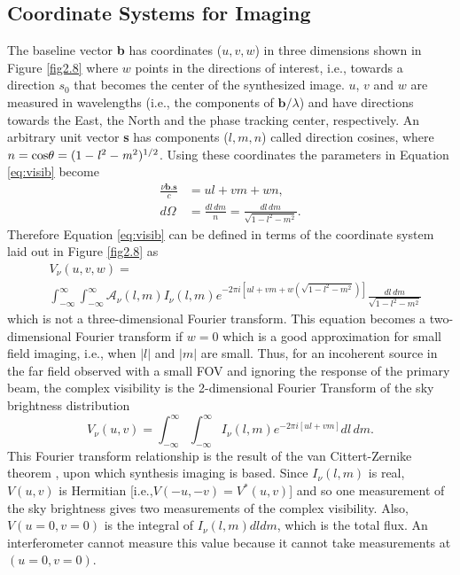 \subsection{Coordinate Systems for Imaging}\label{subsec:7}
The baseline vector \textbf{b} has coordinates ($u,v,w$) in three dimensions shown in Figure \ref{fig2.8} where $w$ points in the directions of interest, i.e., towards a direction \textbf{$s_{0}$} that becomes the center of the synthesized image. $u$, $v$ and $w$ are measured in wavelengths (i.e., the components of $\textbf{b}/\lambda$) and have directions towards the East, the North and the phase tracking center, respectively. An arbitrary unit vector \textbf{s} has components ($l,m,n$) called direction cosines, where $n=\rm{cos}\theta=(1-\mathit{l}^2-\mathit{m}^2)^{1/2}$. Using these coordinates the parameters in Equation \ref{eq:visib} become
\begin{equation}
\begin{split}
\frac{\nu \textbf{b}.\textbf{s}}{c}&=ul+vm+wn, \\
d\Omega &= \frac{dl\,dm}{n}=\frac{dl\,dm}{\sqrt{1-l^2-m^2}}.
\end{split}
\end{equation}
Therefore Equation \ref{eq:visib} can be defined in terms of the coordinate system laid out in Figure \ref{fig2.8} as
\begin{equation}\label{eq:3-d_vis}
\begin{split}
&V_{\nu}(u,v,w)=\\
&\int ^{\infty}_{-\infty}\int ^{\infty}_{-\infty} \mathcal{A}_{\nu}(l,m)I_{\nu}(l,m)\mathit{e}^{-2\pi \mathit{i}[ul+vm+w(\sqrt{1-l^2-m^2})] }\frac{dl\,dm}{\sqrt{1-l^2-m^2}}
\end{split}
\end{equation}
which is not a three-dimensional Fourier transform. This equation becomes a two-dimensional Fourier transform if $w=0$ which is a good approximation for small field imaging, i.e., when $|l|$ and $|m|$ are small. Thus, for an incoherent source in the far field observed with a small FOV and ignoring the response of the primary beam, the complex visibility  is the 2-dimensional Fourier Transform of the sky brightness distribution
\begin{equation}\label{eq:2-d_vis}
V_{\nu}(u,v)=\int ^{\infty}_{-\infty}\int ^{\infty}_{-\infty} I_{\nu}(l,m)\mathit{e}^{-2\pi \mathit{i}[ul+vm]}dl\,dm.
\end{equation}
This Fourier transform relationship is the result of the van Cittert-Zernike theorem \citep{van_cittert_1934}, upon which synthesis imaging is based. Since $I_{\nu}(l,m)$ is real, $V(u,v)$ is Hermitian [i.e.,$V(-u,-v) = V^{*}(u,v)$] and so one measurement of the sky brightness gives two measurements of the complex visibility. Also, $V(u=0,v=0)$ is the integral of $I_{\nu}(l,m)dldm$, which is the total flux. An interferometer cannot measure this value because it cannot take measurements at $(u=0,v=0)$. 

